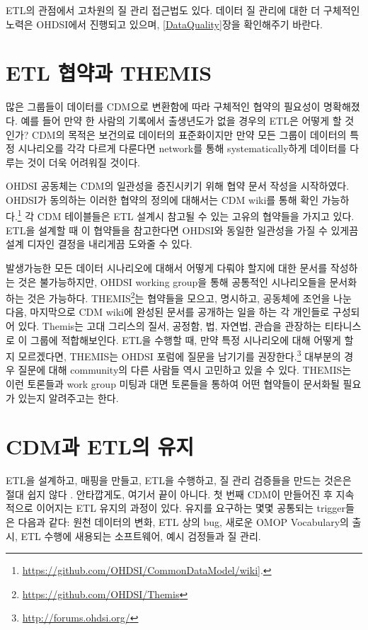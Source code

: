 \documentclass[11pt]{book}
\let\rmarkdownfootnote\footnote%
\def\footnote{\protect\rmarkdownfootnote}
\theoremstyle{definition}
\theoremstyle{definition}
\theoremstyle{definition}
\theoremstyle{remark}
\begin{document}
ETL의 관점에서 고차원의 질 관리 접근법도 있다. 데이터 질 관리에 대한 더
구체적인 노력은 OHDSI에서 진행되고 있으며, \ref{DataQuality}장을
확인해주기 바란다.

\section{ETL 협약과 THEMIS}\label{etl--themis}

많은 그룹들이 데이터를 CDM으로 변환함에 따라 구체적인 협약의 필요성이
명확해졌다. 예를 들어 만약 한 사람의 기록에서 출생년도가 없을 경우의
ETL은 어떻게 할 것인가? CDM의 목적은 보건의료 데이터의 표준화이지만 만약
모든 그룹이 데이터의 특정 시나리오를 각각 다르게 다룬다면 network를 통해
systematically하게 데이터를 다루는 것이 더욱 어려워질 것이다.

OHDSI 공동체는 CDM의 일관성을 증진시키기 위해 협약 문서 작성을
시작하였다. OHDSI가 동의하는 이러한 협약의 정의에 대해서는 CDM wiki를
통해 확인 가능하다.\footnote{\url{https://github.com/OHDSI/CommonDataModel/wiki}{]}.}
각 CDM 테이블들은 ETL 설계시 참고될 수 있는 고유의 협약들을 가지고 있다.
ETL을 설계할 때 이 협약들을 참고한다면 OHDSI와 동일한 일관성을 가질 수
있게끔 설계 디자인 결정을 내리게끔 도와줄 수 있다.

발생가능한 모든 데이터 시나리오에 대해서 어떻게 다뤄야 할지에 대한
문서를 작성하는 것은 불가능하지만, OHDSI working group을 통해 공통적인
시나리오들을 문서화하는 것은 가능하다. THEMIS\footnote{\url{https://github.com/OHDSI/Themis}}는
협약들을 모으고, 명시하고, 공동체에 조언을 나눈 다음, 마지막으로 CDM
wiki에 완성된 문서를 공개하는 일을 하는 각 개인들로 구성되어 있다.
Themis는 고대 그리스의 질서, 공정함, 법, 자연법, 관습을 관장하는
티타니스로 이 그룹에 적합해보인다. ETL을 수행할 때, 만약 특정 시나리오에
대해 어떻게 할 지 모르겠다면, THEMIS는 OHDSI 포럼에 질문을 남기기를
권장한다.\footnote{\url{http://forums.ohdsi.org/}} 대부분의 경우 질문에
대해 community의 다른 사람들 역시 고민하고 있을 수 있다. THEMIS는 이런
토론들과 work group 미팅과 대면 토론들을 통하여 어떤 협약들이 문서화될
필요가 있는지 알려주고는 한다.

\section{CDM과 ETL의 유지}\label{CDMandETLMaintenance}

ETL을 설계하고, 매핑을 만들고, ETL을 수행하고, 질 관리 검증들을 만드는
것은은 절대 쉽지 않다 . 안타깝게도, 여기서 끝이 아니다. 첫 번째 CDM이
만들어진 후 지속적으로 이어지는 ETL 유지의 과정이 있다. 유지를 요구하는
몇몇 공통되는 trigger들은 다음과 같다: 원천 데이터의 변화, ETL 상의 bug,
새로운 OMOP Vocabulary의 출시, ETL 수행에 새용되는 소프트웨어, 예시
검정들과 질 관리.
\end{document}
